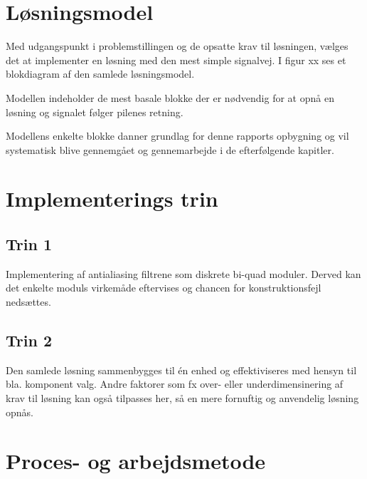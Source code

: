 \section{Løsningsmodel}
Med udgangspunkt i problemstillingen og de opsatte krav til løsningen, vælges det at implementer en løsning med den mest simple signalvej.
I figur xx ses et blokdiagram af den samlede løsningsmodel.


Modellen indeholder de mest basale blokke der er nødvendig for at opnå en løsning og signalet følger pilenes retning.

Modellens enkelte blokke danner grundlag for denne rapports opbygning og vil systematisk blive gennemgået og gennemarbejde i de efterfølgende kapitler.


\section{Implementerings trin}

\subsection{Trin 1}
Implementering af antialiasing filtrene som diskrete bi-quad moduler. 
Derved kan det enkelte moduls virkemåde eftervises og chancen for konstruktionsfejl nedsættes.

\subsection{Trin 2}
Den samlede løsning sammenbygges til én enhed og effektiviseres med hensyn til bla. komponent valg. 
Andre faktorer som fx over- eller underdimensinering af krav til løsning kan også tilpasses her, så en mere fornuftig og anvendelig løsning opnås.


\section{Proces- og arbejdsmetode}
